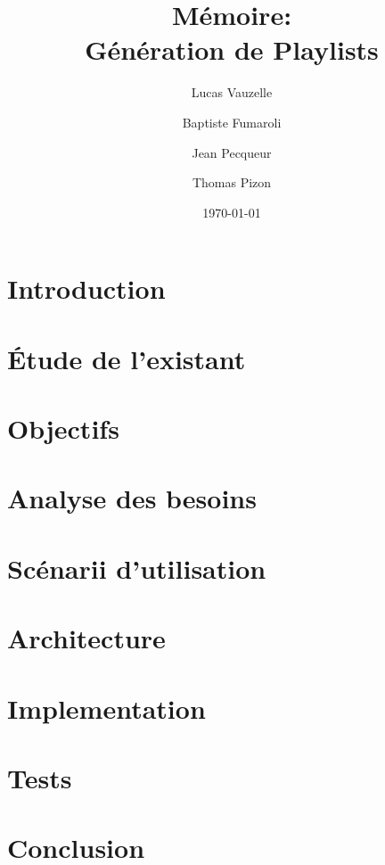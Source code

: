 \documentclass[a4paper, 11pt]{memoir}
\title{Mémoire:\\ Génération de Playlists}
\author{Lucas Vauzelle \and Baptiste Fumaroli \and Jean Pecqueur \and Thomas Pizon}
\date{\today}
\begin{document}
\maketitle %
\clearpage

\frontmatter*

\chapter*{Introduction}


\clearpage

\tableofcontents

\mainmatter*

\chapter{Étude de l'existant}

\chapter{Objectifs}

\chapter{Analyse des besoins}

\chapter{Scénarii d'utilisation}

\chapter{Architecture}

\chapter{Implementation}

\chapter{Tests}

\chapter*{Conclusion}


\backmatter

% 
% 

\listoffigures
\end{document}
